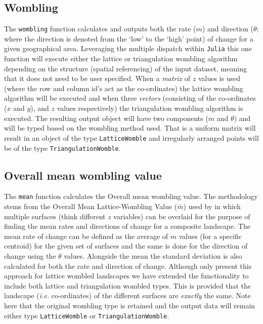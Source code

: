 \subsection{Wombling}\label{wombling}

The \texttt{wombling} function calculates and outputs both the rate
(\(m\)) and direction (\(\theta\); where the direction is denoted from
the `low' to the `high' point) of change for a given geographical area.
Leveraging the multiple dispatch within \texttt{Julia} this one function
will execute either the lattice or triangulation wombling algorithm
depending on the structure (spatial referencing) of the input dataset,
meaning that it does not need to be user specified. When a \emph{matrix}
of \(z\) values is used (where the row and column id's act as the
co-ordinates) the lattice wombling algorithm will be executed and when
three \emph{vectors} (consisting of the co-ordinates (\(x\) and \(y\)),
and \(z\) values respectively) the triangulation wombling algorithm is
executed. The resulting output object will have two components (\(m\)
and \(\theta\)) and will be typed based on the wombling method used.
That is a uniform matrix will result in an object of the type
\texttt{LatticeWomble} and irregularly arranged points will be of the
type \texttt{TriangulationWomble}.

\subsection{Overall mean wombling
value}\label{overall-mean-wombling-value}

The \texttt{mean} function calculates the Overall mean wombling value.
The methodology stems from the Overall Mean Lattice-Wombling Value
(\(\bar{m}\)) used by \cite{Fortin1994EdgDet} in which multiple surfaces
(think different \(z\) variables) can be overlaid for the purpose of
finding the mean rates and directions of change for a composite
landscape. The mean rate of change can be defined as the average of
\(m\) values (for a specific centroid) for the given set of surfaces and
the same is done for the direction of change using the \(\theta\)
values. Alongside the mean the standard deviation is also calculated for
both the rate and direction of change. Although \cite{Fortin1994EdgDet} only
present this approach for lattice wombled landscapes we have extended
the functionality to include both lattice and triangulation wombled
types. This is provided that the landscape (\emph{i.e.} co-ordinates) of
the different surfaces are \emph{exactly} the same. Note here that the
original wombling type is retained and the output data will remain
either type \texttt{LatticeWomble} or \texttt{TriangulationWomble}.

